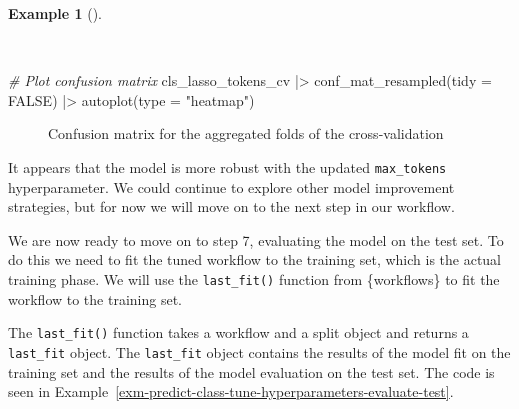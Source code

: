 \documentclass[
  letterpaper,
]{latex/krantz}
\newenvironment{Shaded}{\begin{snugshade}}{\end{snugshade}}
\newcommand{\AttributeTok}[1]{\textcolor[rgb]{0.00,0.00,0.00}{#1}}
\newcommand{\CommentTok}[1]{\textcolor[rgb]{0.00,0.00,0.00}{\textit{#1}}}
\newcommand{\ConstantTok}[1]{\textcolor[rgb]{0.00,0.00,0.00}{#1}}
\newcommand{\FunctionTok}[1]{\textcolor[rgb]{0.00,0.00,0.00}{#1}}
\newcommand{\NormalTok}[1]{\textcolor[rgb]{0.00,0.00,0.00}{#1}}
\newcommand{\SpecialCharTok}[1]{\textcolor[rgb]{0.00,0.00,0.00}{#1}}
\newcommand{\StringTok}[1]{\textcolor[rgb]{0.00,0.00,0.00}{#1}}
\theoremstyle{definition}
\newtheorem{example}{Example}[chapter]
\theoremstyle{remark}
\begin{document}
\begin{example}[]\protect\hypertarget{exm-predict-class-tune-hyperparameters-tokenfilter-evaluate-workflow-cv-confusion}{}\label{exm-predict-class-tune-hyperparameters-tokenfilter-evaluate-workflow-cv-confusion}

~

\begin{Shaded}
\begin{Highlighting}[]
\CommentTok{\# Plot confusion matrix}
\NormalTok{cls\_lasso\_tokens\_cv }\SpecialCharTok{|\textgreater{}}
  \FunctionTok{conf\_mat\_resampled}\NormalTok{(}\AttributeTok{tidy =} \ConstantTok{FALSE}\NormalTok{) }\SpecialCharTok{|\textgreater{}}
  \FunctionTok{autoplot}\NormalTok{(}\AttributeTok{type =} \StringTok{"heatmap"}\NormalTok{)}
\end{Highlighting}
\end{Shaded}

\begin{figure}[!htb]


\caption{\label{fig-predict-class-tune-hyperparameters-tokenfilter-evaluate-workflow-cv-confusion}Confusion
matrix for the aggregated folds of the cross-validation}

\end{figure}%

\end{example}

It appears that the model is more robust with the updated
\texttt{max\_tokens} hyperparameter. We could continue to explore other
model improvement strategies, but for now we will move on to the next
step in our workflow.

We are now ready to move on to step 7, evaluating the model on the test
set. To do this we need to fit the tuned workflow to the training set,
which is the actual training phase. We will use the \texttt{last\_fit()}
function from \{workflows\} to fit the workflow to the training set.

The \texttt{last\_fit()} function takes a workflow and a split object
and returns a \texttt{last\_fit} object. The \texttt{last\_fit} object
contains the results of the model fit on the training set and the
results of the model evaluation on the test set. The code is seen in
Example~\ref{exm-predict-class-tune-hyperparameters-evaluate-test}.
\end{document}
